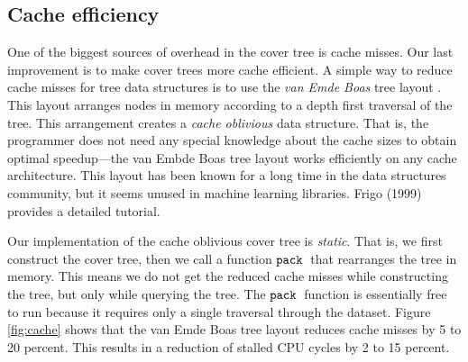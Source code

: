 \documentclass[../main.tex]{subfiles}
\newcommand{\pack}{\ensuremath{\textnormal{\ttfamily pack}}}
\begin{document}

\subsection{Cache efficiency}
\label{sec:cache}

One of the biggest sources of overhead in the cover tree is cache misses.
Our last improvement is to make cover trees more cache efficient.
A simple way to reduce cache misses for tree data structures is to use the \emph{van Emde Boas} tree layout
\cite{frigo1999}.
This layout arranges nodes in memory according to a depth first traversal of the tree.
This arrangement creates a \emph{cache oblivious} data structure.
That is, the programmer does not need any special knowledge about the cache sizes to obtain optimal speedup---the van Embde Boas tree layout works efficiently on any cache architecture.
This layout has been known for a long time in the data structures community, but it seems unused in machine learning libraries.
Frigo (1999) provides a detailed tutorial.
\nocite{frigo1999}

Our implementation of the cache oblivious cover tree is \emph{static}.
That is, we first construct the cover tree, then we call a function \pack~that rearranges the tree in memory.
This means we do not get the reduced cache misses while constructing the tree, but only while querying the tree.
The \pack\ function is essentially free to run because it requires only a single traversal through the dataset.
Figure \ref{fig:cache} shows that the van Emde Boas tree layout reduces cache misses by 5 to 20 percent.
This results in a reduction of stalled CPU cycles by 2 to 15 percent.
\end{document}
